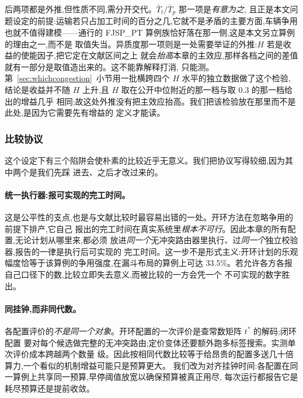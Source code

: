 \documentclass[manuscript,screen,review]{acmart}
\newcommand{\ContentionHi}{33.5\%}
\begin{document}
后两项都是外推,但性质不同,需分开交代。$\bar{T}_t/\bar{T}_p$ 那一项是\emph{有意为之},
且正是本文问题设定的前提:运输若只占加工时间的百分之几,它就不是矛盾的主要方面,车辆争用
也就不值得建模——通行的 FJSP\_PT 算例族恰好落在那一侧,这是本文另立算例的理由之一,而不是
取值失当。异质度那一项则是一处需要举证的外推:$H$ 若是收益的使能因子,把它定在文献区间之上
就会\emph{抬高}本章的主效应,那样各档之间的差值就有一部分是取值造出来的。这不能靠解释打消,
只能测。第~\ref{sec:whichcongestion}~小节用一批横跨四个 $H$ 水平的独立数据做了这个检验,
结论是收益并不随 $H$ 上升,且 $H$ 取在公开中位附近的那一档与取 $0.3$ 的那一档给出的增益几乎
相同;故这处外推没有把主效应抬高。我们把该检验放在那里而不是此处,是因为它需要先有增益的
定义才能读。

\begin{table}[t]
\caption{受控算例族。全部算例格共用 $12$ 工件、$36$ 道真实工序、$8$ 台机械臂、$H=0.3$、
$\bar{T}_t/\bar{T}_p\approx4.0$;三族分别只变化布局、车臂比与柔性。争用强度为初始随机种群
下让行时间占行驶总时间的比例,由算例自身结构决定而非人为设定。}
\label{tab:instances}
\small

\end{table}

\subsubsection{比较协议}
\label{sec:protocol}

这个设定下有三个陷阱会使朴素的比较近乎无意义。我们把协议写得较细,因为其中两个是我们先踩
进去、之后才改过来的。

\paragraph{统一执行器:报可实现的完工时间。}
这是公平性的支点,也是与文献比较时最容易出错的一处。开环方法在忽略争用的前提下排产,它自己
报出的完工时间在真实系统里\emph{根本不可行}。因此本章的所有配置,无论计划从哪里来,都必须
放进\emph{同一个}无冲突路由器里执行、过\emph{同一个}独立校验器,报告的一律是执行后可实现的
完工时间。这一步不是形式主义:开环计划的乐观幅度恰等于该算例的争用强度,在漏斗布局的算例上可达
\ContentionHi{}。若允许各方各报自己口径下的数,比较立即失去意义,而被比较的一方会凭一个
不可实现的数字胜出。

\paragraph{同挂钟,而非同代数。}
各配置评价的\emph{不是同一个对象}。开环配置的一次评价是查常数矩阵 $t^{*}$ 的解码;闭环配置
要对每个候选做完整的无冲突路由;定价变体还要额外跑多标签搜索。实测单次评价成本跨越两个数量
级。因此按相同代数比较等于给昂贵的配置多送几十倍算力,一个看似的机制增益可能只是预算更大。
我们改为对齐挂钟时间:各配置在同一算例上共享同一预算,早停阈值放宽以确保预算被真正用尽,
每次运行都报告它是耗尽预算还是提前收敛。
\end{document}
